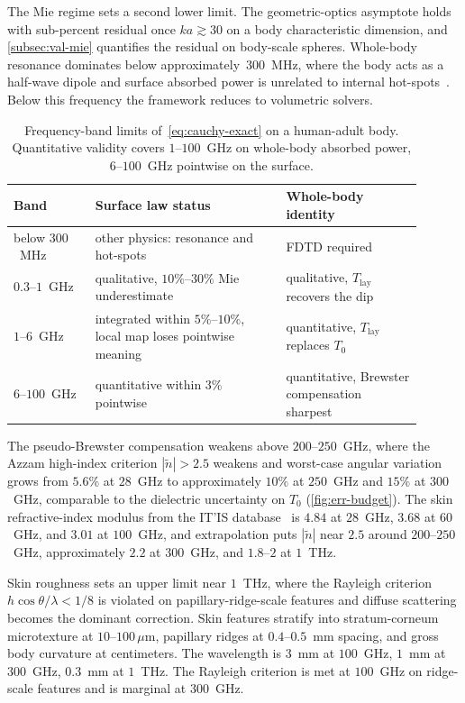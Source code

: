 \documentclass[journal,twocolumn,10pt]{IEEEtran}
\newcommand{\Tlay}{T_{\mathrm{lay}}}
\newcommand{\ntilde}{\tilde{n}}
\begin{document}
The Mie regime sets a second lower limit. The geometric-optics
asymptote holds with sub-percent residual once $ka \gtrsim 30$ on a
body characteristic dimension, and \cref{subsec:val-mie} quantifies
the residual on body-scale spheres. Whole-body resonance dominates
below approximately~$300$~MHz, where the body acts as a half-wave
dipole and surface absorbed power is unrelated to internal
hot-spots~\cite{Durney1986}. Below this frequency the framework
reduces to volumetric solvers.

\begin{table}[!t]
\centering
\caption{Frequency-band limits of~\eqref{eq:cauchy-exact} on a
human-adult body. Quantitative validity covers $1$--$100$~GHz on
whole-body absorbed power, $6$--$100$~GHz pointwise on the
surface.}
\label{tab:bands}
\small
\setlength{\tabcolsep}{4pt}
\begin{tabular}{@{}>{\raggedright\arraybackslash}p{0.18\linewidth}
                  >{\raggedright\arraybackslash}p{0.42\linewidth}
                  >{\raggedright\arraybackslash}p{0.30\linewidth}@{}}
\toprule
Band & Surface law status & Whole-body identity \\
\midrule
below $300$~MHz
  & other physics: resonance and hot-spots
  & FDTD required \\
$0.3$--$1$~GHz
  & qualitative, $10\%$--$30\%$ Mie underestimate
  & qualitative, $\Tlay$ recovers the dip \\
$1$--$6$~GHz
  & integrated within $5\%$--$10\%$, local map loses pointwise meaning
  & quantitative, $\Tlay$ replaces $T_0$ \\
$6$--$100$~GHz
  & quantitative within $3\%$ pointwise
  & quantitative, Brewster compensation sharpest \\
\bottomrule
\end{tabular}
\end{table}

The pseudo-Brewster compensation weakens above $200$--$250$~GHz,
where the Azzam high-index criterion $|\ntilde| > 2.5$ weakens and
worst-case angular variation grows from $5.6\%$ at $28$~GHz to
approximately $10\%$ at $250$~GHz and $15\%$ at $300$~GHz, comparable
to the dielectric uncertainty on $T_0$ (\cref{fig:err-budget}). The
skin refractive-index modulus from the IT'IS database~\cite{ITISv5,Gabriel1996} is $4.84$ at $28$~GHz,
$3.68$ at $60$~GHz, and $3.01$ at $100$~GHz, and extrapolation puts
$|\ntilde|$ near $2.5$ around $200$--$250$~GHz, approximately $2.2$
at $300$~GHz, and $1.8$--$2$ at $1$~THz.

Skin roughness sets an upper limit near $1$~THz, where the Rayleigh
criterion $h\cos\theta/\lambda < 1/8$ is violated on
papillary-ridge-scale features and diffuse scattering becomes the
dominant correction. Skin features stratify into
stratum-corneum microtexture at $10$--$100\,\mu$m, papillary ridges
at $0.4$--$0.5$~mm spacing, and gross body curvature at centimeters.
The wavelength is $3$~mm at $100$~GHz, $1$~mm at $300$~GHz, $0.3$~mm at
$1$~THz. The Rayleigh criterion is met at $100$~GHz on ridge-scale
features and is marginal at $300$~GHz.
\end{document}
